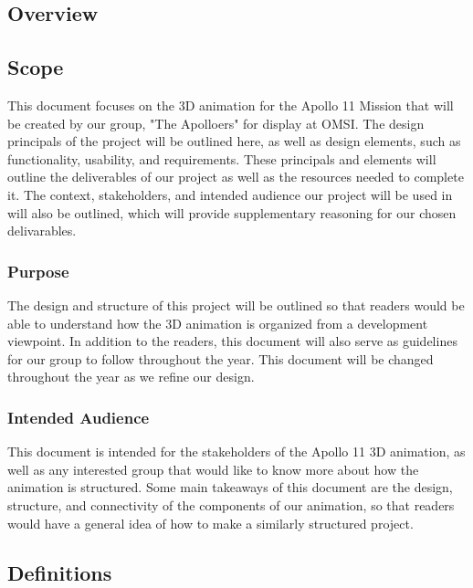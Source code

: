 \documentclass[onecolumn, draftclsnofoot,10pt, compsoc]{IEEEtran}
\begin{document}
\clearpage


\subsection{Overview}
       \subsection{Scope}
        This document focuses on the 3D animation for the Apollo 11 Mission that will be created by our group, "The Apolloers" for display at OMSI. The design principals of the project will be outlined here, as well as design elements, such as functionality, usability, and requirements. These principals and elements will outline the deliverables of our project as well as the resources needed to complete it. The context, stakeholders, and intended audience our project will be used in will also be outlined, which will provide supplementary reasoning for our chosen delivarables. 
        
    \subsubsection{Purpose}
        The design and structure of this project will be outlined so that readers would be able to understand how the 3D animation is organized from a development viewpoint. In addition to the readers, this document will also serve as guidelines for our group to follow throughout the year. This document will be changed throughout the year as we refine our design. 

    \subsubsection{Intended Audience}
        This document is intended for the stakeholders of the Apollo 11 3D animation, as well as any interested group that would like to know more about how the animation is structured. Some main takeaways of this document are the design, structure, and connectivity of the components of our animation, so that readers would have a general idea of how to make a similarly structured project. 

\subsection{Definitions}
\end{document}

